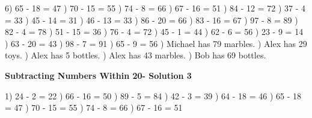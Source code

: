 \documentclass{article}%
\begin{document}
6) 65 {-} 18 = 47%
) 70 {-} 15 = 55%
) 74 {-} 8 = 66%
) 67 {-} 16 = 51%
) 84 {-} 12 = 72%
) 37 {-} 4 = 33%
) 45 {-} 14 = 31%
) 46 {-} 13 = 33%
) 86 {-} 20 = 66%
) 83 {-} 16 = 67%
) 97 {-} 8 = 89%
) 82 {-} 4 = 78%
) 51 {-} 15 = 36%
) 76 {-} 4 = 72%
) 45 {-} 1 = 44%
) 62 {-} 6 = 56%
) 23 {-} 9 = 14%
) 63 {-} 20 = 43%
) 98 {-} 7 = 91%
) 65 {-} 9 = 56%
) Michael has 79 marbles.%
) Alex has 29 toys.%
) Alex has 5 bottles.%
) Alex has 43 marbles.%
) Bob has 69 bottles.%
\newline%
\newpage%
\large%
\begin{center}%
\textbf{Subtracting Numbers Within 20- Solution 3}%
\newline%
\end{center} \normalsize%
1) 24 {-} 2 = 22%
) 66 {-} 16 = 50%
) 89 {-} 5 = 84%
) 42 {-} 3 = 39%
) 64 {-} 18 = 46%
) 65 {-} 18 = 47%
) 70 {-} 15 = 55%
) 74 {-} 8 = 66%
) 67 {-} 16 = 51%
\newline%
\end{document}
